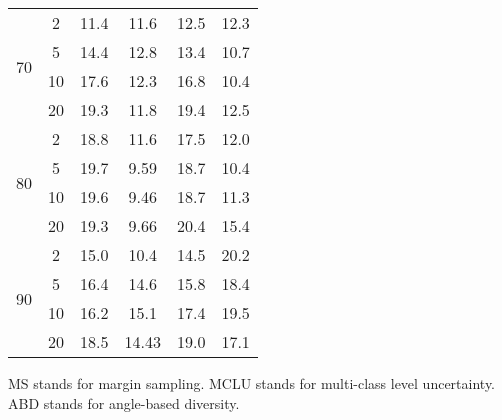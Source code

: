\begin{table}[ht!]
\begin{threeparttable}
\begin{tabular}{ |c| c|c|c|c| c| }
\multirow{4}{*}{70}             &    2              & 11.4        & 11.6       & 12.5             &  12.3                  \\ 
 \cline{2-6}
                                            &    5               & 14.4       &12.8         & 13.4            &   10.7 \\
\cline{2-6}
                                            &    10             & 17.6        & 12.3        & 16.8            &  10.4 \\
\cline{2-6}
                                            &    20             & 19.3       & 11.8        & 19.4             &   12.5    \\
\hline

\multirow{4}{*}{80}             &    2              &18.8         &11.6        & 17.5                 &  12.0                   \\ 
 \cline{2-6}
                                            &    5               &19.7         &  9.59      & 18.7                 &  10.4\\
\cline{2-6}
                                            &    10            &  19.6      &   9.46        & 18.7                & 11.3\\
\cline{2-6}
                                            &    20            &   19.3      &  9.66        & 20.4                & 15.4  \\
\hline

\multirow{4}{*}{90}             &    2              & 15.0        & 10.4       &    14.5        &   20.2                 \\ 
 \cline{2-6}
                                            &    5              &  16.4        & 14.6       &  15.8         &  18.4   \\
\cline{2-6}
                                            &    10            & 16.2        & 15.1        & 17.4          &  19.5  \\
\cline{2-6}
                                            &    20            &  18.5       & 14.43        & 19.0          &  17.1 \\
\hline
\end{tabular}
 \begin{tablenotes}
      \small
      \item MS stands for margin sampling. MCLU stands for multi-class level uncertainty. ABD stands for angle-based diversity.
    \end{tablenotes}    
  \end{threeparttable} 
\label{tab:AL_different_conditions}   
\end{table} 


